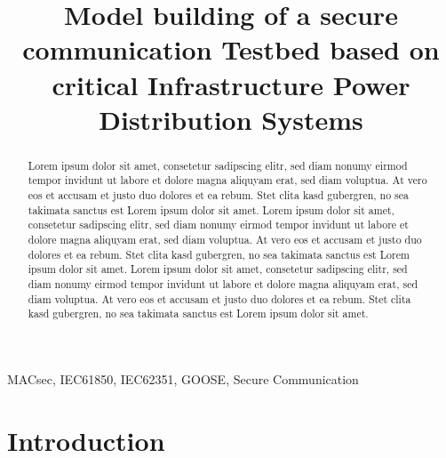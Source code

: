 \documentclass[conference]{IEEEtran}
\begin{document}
\title{Model building of a secure communication Testbed based on critical Infrastructure Power Distribution Systems}

\author{
}

\maketitle

\begin{abstract}
    Lorem ipsum dolor sit amet, consetetur sadipscing elitr, sed diam nonumy eirmod tempor invidunt ut labore et dolore magna aliquyam erat, sed diam 
    voluptua. At vero eos et accusam et justo duo dolores et ea rebum. Stet clita kasd gubergren, no sea takimata sanctus est Lorem ipsum dolor sit 
    amet. Lorem ipsum dolor sit amet, consetetur sadipscing elitr, sed diam nonumy eirmod tempor invidunt ut labore et dolore magna aliquyam erat, sed 
    diam voluptua. At vero eos et accusam et justo duo dolores et ea rebum. Stet clita kasd gubergren, no sea takimata sanctus est Lorem ipsum dolor 
    sit amet. Lorem ipsum dolor sit amet, consetetur sadipscing elitr, sed diam nonumy eirmod tempor invidunt ut labore et dolore magna aliquyam erat, 
    sed diam voluptua. At vero eos et accusam et justo duo dolores et ea rebum. Stet clita kasd gubergren, no sea takimata sanctus est Lorem ipsum dolor 
    sit amet.
\end{abstract}

\begin{IEEEkeywords}
    MACsec, IEC61850, IEC62351, GOOSE, Secure Communication
\end{IEEEkeywords}

\section{Introduction}
\end{document}
